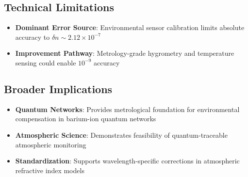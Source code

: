 \documentclass[aip,reprint,groupedaddress,onecolumn,superscriptaddress]{revtex4-2}
\begin{document}
\subsection{Technical Limitations}
\begin{itemize}
    \item \textbf{Dominant Error Source}: Environmental sensor calibration limits absolute accuracy to $\delta n \sim 2.12\times10^{-7}$
    \item \textbf{Improvement Pathway}: Metrology-grade hygrometry and temperature sensing could enable $10^{-9}$ accuracy
\end{itemize}

\subsection{Broader Implications}
\begin{itemize}
    \item \textbf{Quantum Networks}: Provides metrological foundation for environmental compensation in barium-ion quantum networks
    \item \textbf{Atmospheric Science}: Demonstrates feasibility of quantum-traceable atmospheric monitoring
    \item \textbf{Standardization}: Supports wavelength-specific corrections in atmospheric refractive index models
\end{itemize}


\end{document}
